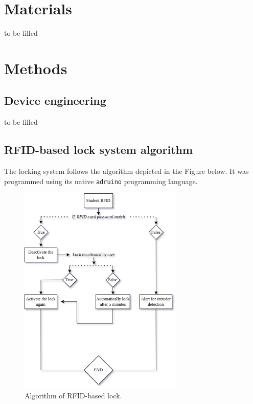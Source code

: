 \documentclass{article}
\begin{document}
    

\section{Materials}

to be filled

\section{Methods}
\subsection*{Device engineering}

to be filled

\subsection*{RFID-based lock system algorithm}

The locking system follows the algorithm depicted in the Figure below. It was programmed using its native \texttt{adruino} programming language. 

\begin{figure}[h!]
    \centering
    \includegraphics[width=0.7\textwidth]{fig2.png}
    \caption{Algorithm of RFID-based lock.} \label{fig:2}
\end{figure}
\end{document}
